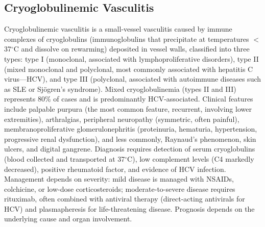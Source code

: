 \subsection{Cryoglobulinemic Vasculitis}
\label{sec:Cryoglobulinemic Vasculitis}
Cryoglobulinemic vasculitis is a small-vessel vasculitis caused by immune complexes of cryoglobulins (immunoglobulins that precipitate at temperatures $<$37$^\circ$C and dissolve on rewarming) deposited in vessel walls, classified into three types: type I (monoclonal, associated with lymphoproliferative disorders), type II (mixed monoclonal and polyclonal, most commonly associated with hepatitis C virus---HCV), and type III (polyclonal, associated with autoimmune diseases such as SLE or Sjögren's syndrome). Mixed cryoglobulinemia (types II and III) represents 80\% of cases and is predominantly HCV-associated. Clinical features include palpable purpura (the most common feature, recurrent, involving lower extremities), arthralgias, peripheral neuropathy (symmetric, often painful), membranoproliferative glomerulonephritis (proteinuria, hematuria, hypertension, progressive renal dysfunction), and less commonly, Raynaud's phenomenon, skin ulcers, and digital gangrene. Diagnosis requires detection of serum cryoglobulins (blood collected and transported at 37$^\circ$C), low complement levels (C4 markedly decreased), positive rheumatoid factor, and evidence of HCV infection. Management depends on severity: mild disease is managed with NSAIDs, colchicine, or low-dose corticosteroids; moderate-to-severe disease requires rituximab, often combined with antiviral therapy (direct-acting antivirals for HCV) and plasmapheresis for life-threatening disease. Prognosis depends on the underlying cause and organ involvement.

